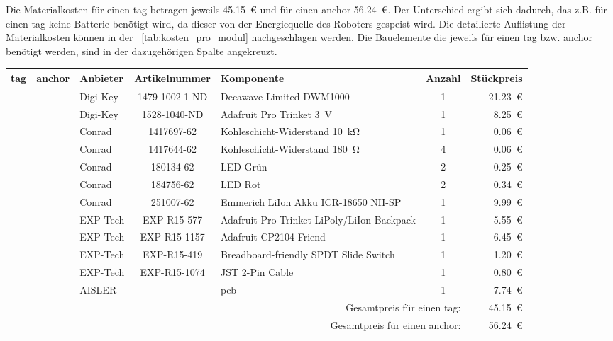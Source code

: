 Die Materialkosten für einen \gls{tag} betragen jeweils \SI{45.15}{\euro} und für einen \gls{anchor} \SI{56.24}{\euro}. Der Unterschied ergibt sich dadurch, das z.B. für einen \gls{tag} keine Batterie benötigt wird, da dieser von der Energiequelle des Roboters gespeist wird.
Die detailierte Auflistung der Materialkosten können in der \tablename~\ref{tab:kosten_pro_modul} nachgeschlagen werden. Die Bauelemente die jeweils für einen \gls{tag} bzw. \gls{anchor} benötigt werden, sind in der dazugehörigen Spalte angekreuzt.

\begin{sidewaystable}
	\centering
	\begin{tabular}{||c|c|l|c|l|c|r||} 
		\hline
		\gls{tag} & \gls{anchor} & Anbieter & Artikelnummer & Komponente & Anzahl & Stückpreis\\\hline
		\hline
		\CheckedBox & \CheckedBox & Digi-Key & 1479-1002-1-ND & Decawave Limited DWM1000 & 1 & \SI{21.23}{\euro}\\\hline
		\CheckedBox & \CheckedBox & Digi-Key & 1528-1040-ND & Adafruit Pro Trinket \SI{3}{\volt} & 1 & \SI{8.25}{\euro}\\\hline
		\hline
		\CheckedBox & \CheckedBox & Conrad & 1417697-62 & Kohleschicht-Widerstand \SI{10}{\kilo\ohm} & 1 & \SI{0.06}{\euro}\\\hline
		\CheckedBox & \CheckedBox & Conrad & 1417644-62 & Kohleschicht-Widerstand \SI{180}{\ohm} & 4 & \SI{0.06}{\euro}\\\hline
		\CheckedBox & \CheckedBox & Conrad & 180134-62 & LED Grün & 2 & \SI{0.25}{\euro}\\\hline
		\CheckedBox & \CheckedBox & Conrad & 184756-62 & LED Rot & 2 & \SI{0.34}{\euro}\\\hline
		\Square & \CheckedBox & Conrad & 251007-62 & Emmerich LiIon Akku ICR-18650 NH-SP& 1 & \SI{9.99}{\euro}\\\hline
		\hline
		\Square & \CheckedBox & EXP-Tech & EXP-R15-577 & Adafruit Pro Trinket LiPoly/LiIon Backpack & 1 & \SI{5.55}{\euro}\\\hline
		\CheckedBox & \Square & EXP-Tech & EXP-R15-1157 & Adafruit CP2104 Friend & 1 & \SI{6.45}{\euro}\\\hline
		\Square & \CheckedBox & EXP-Tech & EXP-R15-419 & Breadboard-friendly SPDT Slide Switch & 1 & \SI{1.20}{\euro}\\\hline
		\Square & \CheckedBox & EXP-Tech & EXP-R15-1074 & JST 2-Pin Cable & 1 & \SI{0.80}{\euro}\\\hline
		\hline
		\CheckedBox & \CheckedBox & AISLER & -- & \acrlong{pcb} & 1 & \SI{7.74}{\euro}\\\hline
		\hline
		\multicolumn{6}{|r|}{Gesamtpreis für einen \gls{tag}:} & \SI{45.15}{\euro}\\\hline
		\multicolumn{6}{|r|}{Gesamtpreis für einen \gls{anchor}:} & \SI{56.24}{\euro}\\\hline
	\end{tabular}
	\caption{Materialkosten pro \gls{tag} bzw. \gls{anchor}.}
	\label{tab:kosten_pro_modul}
\end{sidewaystable}


